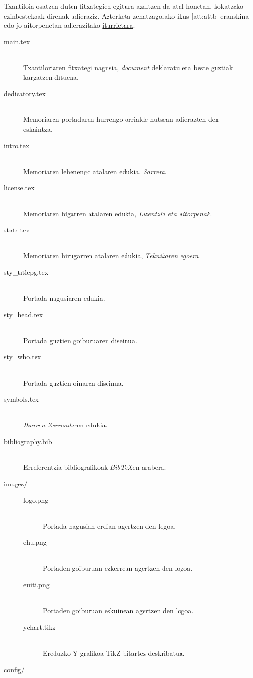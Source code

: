 %

Txantiloia osatzen duten fitxategien egitura azaltzen da atal honetan, kokatzeko ezinbestekoak direnak adieraziz. Azterketa zehatzagorako ikus \hyperref[att:attb]{\ref*{att:attb} eranskina} edo jo aitorpenetan adierazitako \hyperref[lic]{iturrietara}.

\begin{description}
 \item[main.tex]{\hfill\\Txantiloriaren fitxategi nagusia, \emph{document} deklaratu eta beste guztiak kargatzen dituena.}
 \item[dedicatory.tex]{\hfill\\Memoriaren portadaren hurrengo orrialde hutsean adierazten den eskaintza.}
 \item[intro.tex]{\hfill\\Memoriaren lehenengo atalaren edukia, \emph{Sarrera}.}
 \item[license.tex]{\hfill\\Memoriaren bigarren atalaren edukia, \emph{Lizentzia eta aitorpenak}.}
 \item[state.tex]{\hfill\\Memoriaren hirugarren atalaren edukia, \emph{Teknikaren egoera}.}
 \item[sty\_titlepg.tex]{\hfill\\Portada nagusiaren edukia.}
 \item[sty\_head.tex]{\hfill\\Portada guztien goiburuaren diseinua.}
 \item[sty\_who.tex]{\hfill\\Portada guztien oinaren diseinua.}
 \item[symbols.tex]{\hfill\\\emph{Ikurren Zerrenda}ren edukia.}
 \item[bibliography.bib]{\hfill\\Erreferentzia bibliografikoak \emph{BibTeX}en arabera.}
 \item[images/]{\hfill
 
  \begin{description}
   \item[logo.png]{\hfill\\Portada nagusian erdian agertzen den logoa.}
   \item[ehu.png]{\hfill\\Portaden goiburuan ezkerrean agertzen den logoa.}
   \item[euiti.png]{\hfill\\Portaden goiburuan eskuinean agertzen den logoa.}
   \item[ychart.tikz]{\hfill\\Ereduzko Y-grafikoa TikZ bitartez deskribatua.}
  \end{description} 
 }
 \item[config/]{\hfill
 
}
\end{description}
